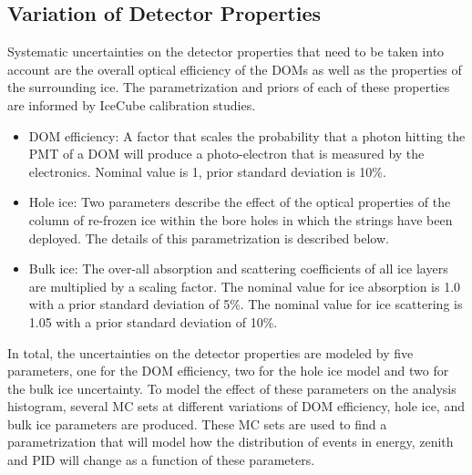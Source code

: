 
\subsection{Variation of Detector Properties}
\label{sec:detector-unc}
Systematic uncertainties on the detector properties that need to be taken into account are the overall optical efficiency of the DOMs as well as the properties of the surrounding ice.
The parametrization and priors of each of these properties are informed by IceCube calibration studies.
\begin{itemize}
    \item DOM efficiency: A factor that scales the probability that a photon hitting the PMT of a DOM will produce a photo-electron that is measured by the electronics.
Nominal value is 1, prior standard deviation is 10\%.
    \item Hole ice: Two parameters describe the effect of the optical properties of the column of re-frozen ice within the bore holes in which the strings have been deployed.
The details of this parametrization is described below.
    \item Bulk ice: The over-all absorption and scattering coefficients of all ice layers are multiplied by a scaling factor.
The nominal value for ice absorption is 1.0 with a prior standard deviation of 5\%.
The nominal value for ice scattering is 1.05 with a prior standard deviation of 10\%.
\end{itemize}

In total, the uncertainties on the detector properties are modeled by five  parameters, one for the DOM efficiency, two for the hole ice model and two for the bulk ice uncertainty.
To model the effect of these parameters on the analysis histogram, several MC sets at different variations of DOM efficiency, hole ice, and bulk ice parameters are produced.
These MC sets are used to find a parametrization that will model how the distribution of events in energy, zenith and PID will change as a function of these parameters.

